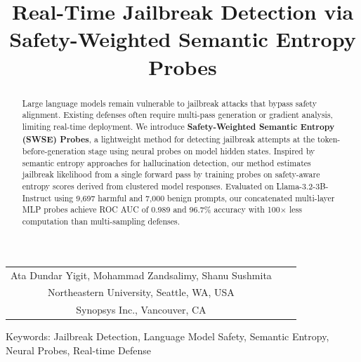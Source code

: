 \documentclass[10pt]{cai}
\begin{document}
\def\conferenceyear{2026}
\begin{center}

\title{Real-Time Jailbreak Detection via Safety-Weighted Semantic Entropy Probes}
\maketitle

\thispagestyle{empty}

\begin{tabular}{ccc}
Ata Dundar Yigit\upstairs{\affilone,*}, Mohammad Zandsalimy\upstairs{\affiltwo}, Shanu Sushmita\upstairs{\affilone}
\\[0.25ex]
{\small \upstairs{\affilone} Northeastern University, Seattle, WA, USA} \\
{\small \upstairs{\affiltwo} Synopsys Inc., Vancouver, CA} \\
\end{tabular}
  
\vspace*{0.2in}
\end{center}


\begin{abstract}
Large language models remain vulnerable to jailbreak attacks that bypass safety alignment. Existing defenses often require multi-pass generation or gradient analysis, limiting real-time deployment. We introduce \textbf{Safety-Weighted Semantic Entropy (SWSE) Probes}, a lightweight method for detecting jailbreak attempts at the token-before-generation stage using neural probes on model hidden states. Inspired by semantic entropy approaches for hallucination detection, our method estimates jailbreak likelihood from a single forward pass by training probes on safety-aware entropy scores derived from clustered model responses. Evaluated on Llama-3.2-3B-Instruct using 9,697 harmful and 7,000 benign prompts, our concatenated multi-layer MLP probes achieve ROC AUC of 0.989 and 96.7\% accuracy with 100$\times$ less computation than multi-sampling defenses.
\end{abstract}

\begin{keywords}{Keywords:}
Jailbreak Detection, Language Model Safety, Semantic Entropy, Neural Probes, Real-time Defense
\end{keywords}
\copyrightnotice
\end{document}
